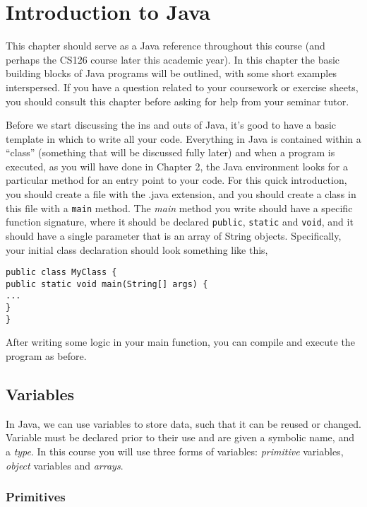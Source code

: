 \clearpage
\section{Introduction to Java}

This chapter should serve as a Java reference throughout this course (and perhaps the CS126 course later this academic year). In this chapter the basic building blocks of Java programs will be outlined, with some short examples interspersed. If you have a question related to your coursework or exercise sheets, you should consult this chapter before asking for help from your seminar tutor.

Before we start discussing the ins and outs of Java, it's good to have a basic template in which to write all your code. Everything in Java is contained within a ``class'' (something that will be discussed fully later) and when a program is executed, as you will have done in Chapter 2, the Java environment looks for a particular method for an entry point to your code. For this quick introduction, you should create a file with the .java extension, and you should create a class in this file with a {\tt main} method. The \emph{main} method you write should have a specific function signature, where it should be declared {\tt public}, {\tt static} and {\tt void}, and it should have a single parameter that is an array of String objects. Specifically, your initial class declaration should look something like this,

\begin{verbatim}
public class MyClass {
public static void main(String[] args) {
...
}
}
\end{verbatim} 

After writing some logic in your main function, you can compile and execute the program as before.

\subsection{Variables}

In Java, we can use variables to store data, such that it can be reused or changed. Variable must be declared prior to their use and are given a symbolic name, and a \emph{type}. In this course you will use three forms of variables: \emph{primitive} variables, \emph{object} variables and \emph{arrays}.

\subsubsection*{Primitives}


